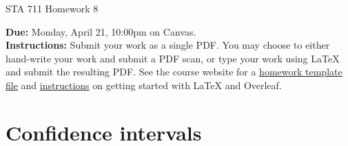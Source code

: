 \documentclass[11pt]{article}
\begin{document}
\begin{center}
\Large
STA 711 Homework 8\\
\normalsize
\vspace{5mm}
\end{center}
\noindent \textbf{Due:} Monday, April 21, 10:00pm on Canvas.\\ 

\noindent \textbf{Instructions:} Submit your work as a single PDF. You may choose to either hand-write your work and submit a PDF scan, or type your work using LaTeX and submit the resulting PDF. See the course website for a \href{https://sta711-s25.github.io/homework/hw_template.tex}{homework template file} and \href{https://sta711-s25.github.io/homework/latex_instructions/}{instructions} on getting started with LaTeX and Overleaf.

\section*{Confidence intervals}
\end{document}
